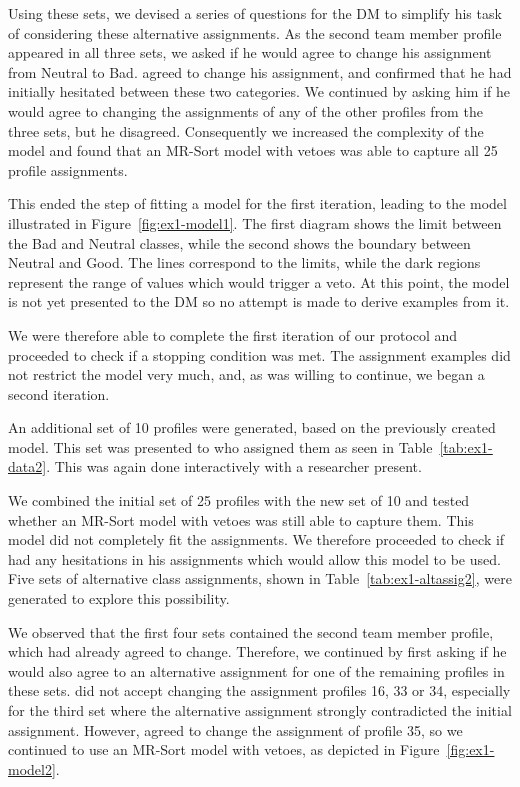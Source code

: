 

Using these sets, we devised a series of questions for the DM to simplify his task of considering these alternative assignments. As the second team member profile appeared in all three sets, we asked if he would agree to change his assignment from Neutral to Bad. \GJ agreed to change his assignment, and confirmed that he had initially hesitated between these two categories. We continued by asking him if he would agree to changing the assignments of any of the other profiles from the three sets, but he disagreed. Consequently we increased the complexity of the model and found that an MR-Sort model with vetoes was able to capture all 25 profile assignments.

This ended the step of fitting a model for the first iteration, leading to the model illustrated in Figure~\ref{fig:ex1-model1}. The first diagram shows the limit between the Bad and Neutral classes, while the second shows the boundary between Neutral and Good. The lines correspond to the limits, while the dark regions represent the range of values which would trigger a veto. At this point, the model is not yet presented to the DM so no attempt is made to derive examples from it.



We were therefore able to complete the first iteration of our protocol and proceeded to check if a stopping condition was met. The assignment examples did not restrict the model very much, and, as \GJ was willing to continue, we began a second iteration.

An additional set of 10 profiles were generated, based on the previously created model. This set was presented to \GJ who assigned them as seen in Table~\ref{tab:ex1-data2}. This was again done interactively with a researcher present.



We combined the initial set of 25 profiles with the new set of 10 and tested whether an MR-Sort model with vetoes was still able to capture them. This model did not completely fit the assignments. We therefore proceeded to check if \GJ had any hesitations in his assignments which would allow this model to be used. Five sets of alternative class assignments, shown in Table~\ref{tab:ex1-altassig2}, were generated to explore this possibility.



We observed that the first four sets contained the second team member profile, which \GJ had already agreed to change. Therefore, we continued by first asking if he would also agree to an alternative assignment for one of the remaining profiles in these sets. \GJ did not accept changing the assignment profiles 16, 33 or 34, especially for the third set where the alternative assignment strongly contradicted the initial assignment. However, \GJ agreed to change the assignment of profile 35, so we continued to use an MR-Sort model with vetoes, as depicted in Figure~\ref{fig:ex1-model2}.

